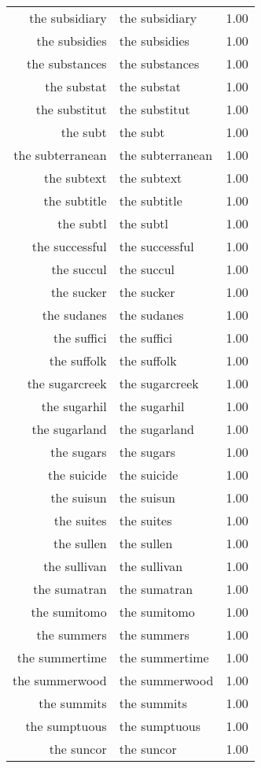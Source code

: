 \begin{table}[ht]
\begin{tabular}{rlr}
  the subsidiary & the subsidiary & 1.00 \\ 
  the subsidies & the subsidies & 1.00 \\ 
  the substances & the substances & 1.00 \\ 
  the substat & the substat & 1.00 \\ 
  the substitut & the substitut & 1.00 \\ 
  the subt & the subt & 1.00 \\ 
  the subterranean & the subterranean & 1.00 \\ 
  the subtext & the subtext & 1.00 \\ 
  the subtitle & the subtitle & 1.00 \\ 
  the subtl & the subtl & 1.00 \\ 
  the successful & the successful & 1.00 \\ 
  the succul & the succul & 1.00 \\ 
  the sucker & the sucker & 1.00 \\ 
  the sudanes & the sudanes & 1.00 \\ 
  the suffici & the suffici & 1.00 \\ 
  the suffolk & the suffolk & 1.00 \\ 
  the sugarcreek & the sugarcreek & 1.00 \\ 
  the sugarhil & the sugarhil & 1.00 \\ 
  the sugarland & the sugarland & 1.00 \\ 
  the sugars & the sugars & 1.00 \\ 
  the suicide & the suicide & 1.00 \\ 
  the suisun & the suisun & 1.00 \\ 
  the suites & the suites & 1.00 \\ 
  the sullen & the sullen & 1.00 \\ 
  the sullivan & the sullivan & 1.00 \\ 
  the sumatran & the sumatran & 1.00 \\ 
  the sumitomo & the sumitomo & 1.00 \\ 
  the summers & the summers & 1.00 \\ 
  the summertime & the summertime & 1.00 \\ 
  the summerwood & the summerwood & 1.00 \\ 
  the summits & the summits & 1.00 \\ 
  the sumptuous & the sumptuous & 1.00 \\ 
  the suncor & the suncor & 1.00 \\ 

\end{tabular}
\end{table}
